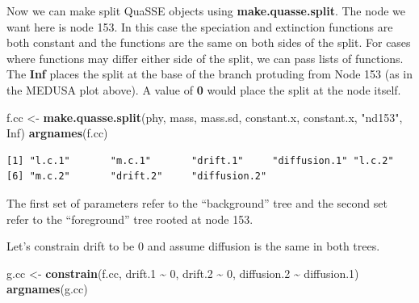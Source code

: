 \documentclass[
]{book}
\newenvironment{Shaded}{\begin{snugshade}}{\end{snugshade}}
\newcommand{\DataTypeTok}[1]{\textcolor[rgb]{0.13,0.29,0.53}{#1}}
\newcommand{\DecValTok}[1]{\textcolor[rgb]{0.00,0.00,0.81}{#1}}
\newcommand{\FloatTok}[1]{\textcolor[rgb]{0.00,0.00,0.81}{#1}}
\newcommand{\KeywordTok}[1]{\textcolor[rgb]{0.13,0.29,0.53}{\textbf{#1}}}
\newcommand{\NormalTok}[1]{#1}
\newcommand{\OperatorTok}[1]{\textcolor[rgb]{0.81,0.36,0.00}{\textbf{#1}}}
\newcommand{\OtherTok}[1]{\textcolor[rgb]{0.56,0.35,0.01}{#1}}
\newcommand{\StringTok}[1]{\textcolor[rgb]{0.31,0.60,0.02}{#1}}
\begin{document}
\begin{Shaded}
\end{Shaded}

Now we can make split QuaSSE objects using \textbf{make.quasse.split}. The node we want here is node 153. In this case the speciation and extinction functions are both constant and the functions are the same on both sides of the split. For cases where functions may differ either side of the split, we can pass lists of functions. The \textbf{Inf} places the split at the base of the branch protuding from Node 153 (as in the MEDUSA plot above). A value of \textbf{0} would place the split at the node itself.

\begin{Shaded}
\begin{Highlighting}[]
\NormalTok{f.cc \textless{}{-}}\StringTok{ }\KeywordTok{make.quasse.split}\NormalTok{(phy, mass, mass.sd, }
\NormalTok{                          constant.x, constant.x, }
                          \StringTok{"nd153"}\NormalTok{, }\OtherTok{Inf}\NormalTok{)}
\KeywordTok{argnames}\NormalTok{(f.cc)}
\end{Highlighting}
\end{Shaded}

\begin{verbatim}
[1] "l.c.1"       "m.c.1"       "drift.1"     "diffusion.1" "l.c.2"      
[6] "m.c.2"       "drift.2"     "diffusion.2"
\end{verbatim}

The first set of parameters refer to the ``background'' tree and the second set refer to the ``foreground'' tree rooted at node 153.

Let's constrain drift to be 0 and assume diffusion is the same in both trees.

\begin{Shaded}
\begin{Highlighting}[]
\NormalTok{g.cc \textless{}{-}}\StringTok{ }\KeywordTok{constrain}\NormalTok{(f.cc, drift}\FloatTok{.1} \OperatorTok{\textasciitilde{}}\StringTok{ }\DecValTok{0}\NormalTok{, drift}\FloatTok{.2} \OperatorTok{\textasciitilde{}}\StringTok{ }\DecValTok{0}\NormalTok{, }
\NormalTok{                  diffusion}\FloatTok{.2} \OperatorTok{\textasciitilde{}}\StringTok{ }\NormalTok{diffusion}\FloatTok{.1}\NormalTok{)}
\KeywordTok{argnames}\NormalTok{(g.cc)}
\end{Highlighting}
\end{Shaded}
\end{document}
